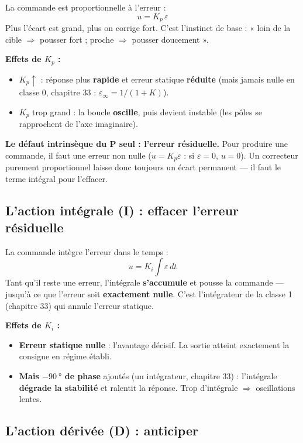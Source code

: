 \documentclass[12pt,a4paper,twoside]{book}
\begin{document}
\begin{formule}
La commande est proportionnelle à l'erreur :
\[
u = K_p\,\varepsilon
\]
Plus l'écart est grand, plus on corrige fort. C'est l'instinct de base : « loin de la cible $\Rightarrow$ pousser fort ; proche $\Rightarrow$ pousser doucement ».

\textbf{Effets de $K_p$ :}
\begin{itemize}[nosep]
\item $K_p \uparrow$ : réponse plus \textbf{rapide} et erreur statique \textbf{réduite} (mais jamais nulle en classe 0, chapitre 33 : $\varepsilon_\infty = 1/(1+K)$).
\item $K_p$ trop grand : la boucle \textbf{oscille}, puis devient instable (les pôles se rapprochent de l'axe imaginaire).
\end{itemize}
\textbf{Le défaut intrinsèque du P seul : l'erreur résiduelle.} Pour produire une commande, il faut une erreur non nulle ($u = K_p\varepsilon$ : si $\varepsilon = 0$, $u = 0$). Un correcteur purement proportionnel laisse donc toujours un écart permanent --- il faut le terme intégral pour l'effacer.
\end{formule}

\subsection{L'action intégrale (I) : effacer l'erreur résiduelle}

\begin{formule}
La commande intègre l'erreur dans le temps :
\[
u = K_i \int \varepsilon\,dt
\]
Tant qu'il reste une erreur, l'intégrale \textbf{s'accumule} et pousse la commande --- jusqu'à ce que l'erreur soit \textbf{exactement nulle}. C'est l'intégrateur de la classe 1 (chapitre 33) qui annule l'erreur statique.

\textbf{Effets de $K_i$ :}
\begin{itemize}[nosep]
\item \textbf{Erreur statique nulle} : l'avantage décisif. La sortie atteint exactement la consigne en régime établi.
\item \textbf{Mais $-\SI{90}{°}$ de phase} ajoutés (un intégrateur, chapitre 33) : l'intégrale \textbf{dégrade la stabilité} et ralentit la réponse. Trop d'intégrale $\Rightarrow$ oscillations lentes.
\end{itemize}
\end{formule}

\subsection{L'action dérivée (D) : anticiper}
\end{document}
